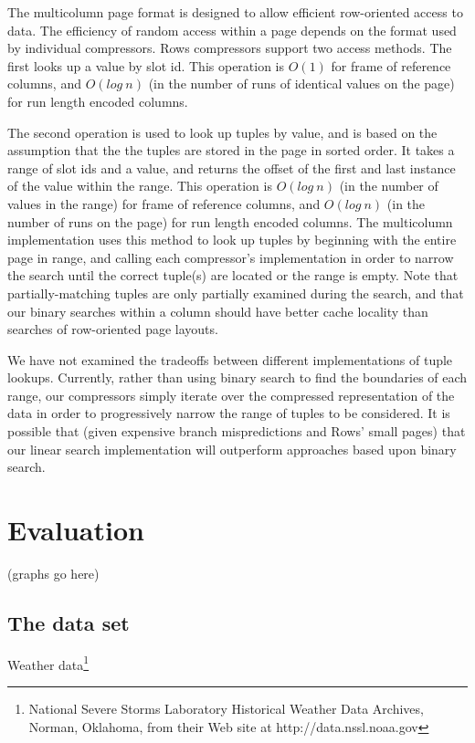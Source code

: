 \documentclass{sig-alternate-sigmod08}
\newcommand{\rows}{Rows\xspace}
\newcommand{\rowss}{Rows'\xspace}
\begin{document}
The multicolumn page format is designed to allow efficient
row-oriented access to data.  The efficiency of random access within a
page depends on the format used by individual compressors.  \rows
compressors support two access methods.  The first looks up a value by
slot id.  This operation is $O(1)$ for frame of reference columns, and
$O(log~n)$ (in the number of runs of identical values on the page) for
run length encoded columns.

The second operation is used to look up tuples by value, and is based
on the assumption that the the tuples are stored in the page in sorted
order.  It takes a range of slot ids and a value, and returns the
offset of the first and last instance of the value within the range.
This operation is $O(log~n)$ (in the number of values in the range)
for frame of reference columns, and $O(log~n)$ (in the number of runs
on the page) for run length encoded columns.  The multicolumn
implementation uses this method to look up tuples by beginning with
the entire page in range, and calling each compressor's implementation
in order to narrow the search until the correct tuple(s) are located
or the range is empty.  Note that partially-matching tuples are only
partially examined during the search, and that our binary searches
within a column should have better cache locality than searches of
row-oriented page layouts.

We have not examined the tradeoffs between different implementations
of tuple lookups.  Currently, rather than using binary search to find
the boundaries of each range, our compressors simply iterate over the
compressed representation of the data in order to progressively narrow
the range of tuples to be considered.  It is possible that (given
expensive branch mispredictions and \rowss small pages) that our
linear search implementation will outperform approaches based upon
binary search.

\section{Evaluation}
(graphs go here)

\subsection{The data set}

Weather data\footnote{National Severe Storms Laboratory Historical
  Weather Data Archives, Norman, Oklahoma, from their Web site at
  http://data.nssl.noaa.gov}
\end{document}
